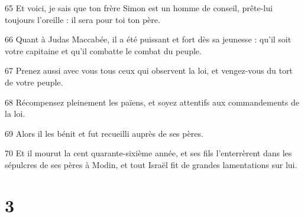 \par 65 Et voici, je sais que ton frère Simon est un homme de conseil, prête-lui toujours l'oreille : il sera pour toi ton père.
\par 66 Quant à Judas Maccabée, il a été puissant et fort dès sa jeunesse : qu'il soit votre capitaine et qu'il combatte le combat du peuple.
\par 67 Prenez aussi avec vous tous ceux qui observent la loi, et vengez-vous du tort de votre peuple.
\par 68 Récompensez pleinement les païens, et soyez attentifs aux commandements de la loi.
\par 69 Alors il les bénit et fut recueilli auprès de ses pères.
\par 70 Et il mourut la cent quarante-sixième année, et ses fils l'enterrèrent dans les sépulcres de ses pères à Modin, et tout Israël fit de grandes lamentations sur lui.

\chapter{3}

